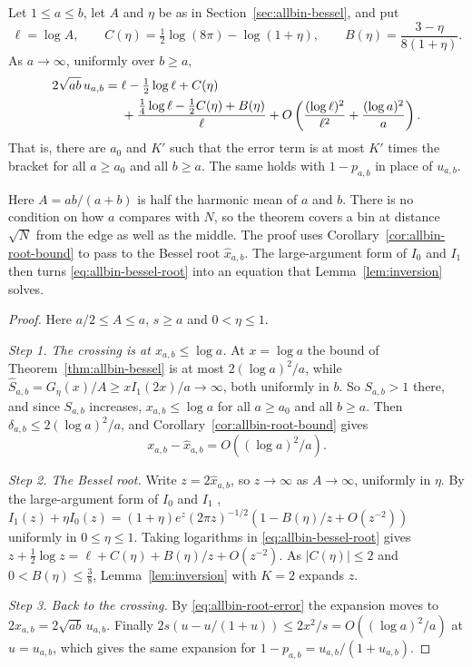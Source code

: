 \begin{theorem}\label{thm:allbin-expansion}
Let $1\le a\le b$, let $A$ and $\eta$ be as in Section~\ref{sec:allbin-bessel}, and put
\[
 \ell=\log A,\qquad
 C(\eta)=\tfrac12\log(8\pi)-\log(1+\eta),\qquad
 B(\eta)=\frac{3-\eta}{8(1+\eta)}.
\]
As $a\to\infty$, uniformly over $b\ge a$,
\begin{align}
 2\sqrt{ab}\,u_{a,b}
 ={}&\ell-\tfrac12\log\ell+C(\eta)\notag\\
 &+\frac{\tfrac14\log\ell-\tfrac12C(\eta)+B(\eta)}{\ell}
 +O\left(\frac{(\log\ell)^2}{\ell^2}+\frac{(\log a)^2}{a}\right).
 \label{eq:allbin-expansion}
\end{align}
That is, there are $a_0$ and $K'$ such that the error term is at most $K'$
times the bracket for all $a\ge a_0$ and all $b\ge a$. The same holds with
$1-p_{a,b}$ in place of $u_{a,b}$.
\end{theorem}

Here $A=ab/(a+b)$ is half the harmonic mean of $a$ and $b$. There is no
condition on how $a$ compares with $N$, so the theorem covers a bin at
distance $\sqrt N$ from the edge as well as the middle. The proof uses
Corollary~\ref{cor:allbin-root-bound} to pass to the Bessel root $\hat x_{a,b}$. The
large-argument form of $I_0$ and $I_1$ then turns
\eqref{eq:allbin-bessel-root} into an equation that Lemma~\ref{lem:inversion}
solves.

\begin{proof}
Here $a/2\le A\le a$, $s\ge a$ and $0<\eta\le1$.

\emph{Step 1. The crossing is at $x_{a,b}\le\log a$.} At $x=\log a$ the bound
of Theorem~\ref{thm:allbin-bessel} is at most $2(\log a)^2/a$, while
$\widehat S_{a,b}=G_\eta(x)/A\ge xI_1(2x)/a\to\infty$, both uniformly in $b$. So $S_{a,b}>1$ there, and since
$S_{a,b}$ increases, $x_{a,b}\le\log a$ for all $a\ge a_0$ and all $b\ge a$. Then
$\delta_{a,b}\le2(\log a)^2/a$, and Corollary~\ref{cor:allbin-root-bound}
gives
\begin{equation}\label{eq:allbin-root-error}
 x_{a,b}-\hat x_{a,b}=O((\log a)^2/a).
\end{equation}

\emph{Step 2. The Bessel root.} Write $z=2\hat x_{a,b}$, so $z\to\infty$ as
$A\to\infty$, uniformly in $\eta$. By the large-argument form of $I_0$ and
$I_1$ \cite[Eq.~10.40.1]{dlmf},
$I_1(z)+\eta I_0(z)=(1+\eta)e^z(2\pi z)^{-1/2}(1-B(\eta)/z+O(z^{-2}))$
uniformly in $0\le\eta\le1$. Taking logarithms in
\eqref{eq:allbin-bessel-root} gives
$z+\frac12\log z=\ell+C(\eta)+B(\eta)/z+O(z^{-2})$. As $|C(\eta)|\le2$ and
$0<B(\eta)\le\frac38$, Lemma~\ref{lem:inversion} with $K=2$ expands $z$.

\emph{Step 3. Back to the crossing.} By \eqref{eq:allbin-root-error} the
expansion moves to $2x_{a,b}=2\sqrt{ab}\,u_{a,b}$. Finally
$2s(u-u/(1+u))\le2x^2/s=O((\log a)^2/a)$ at $u=u_{a,b}$, which gives the same
expansion for $1-p_{a,b}=u_{a,b}/(1+u_{a,b})$.
\end{proof}

